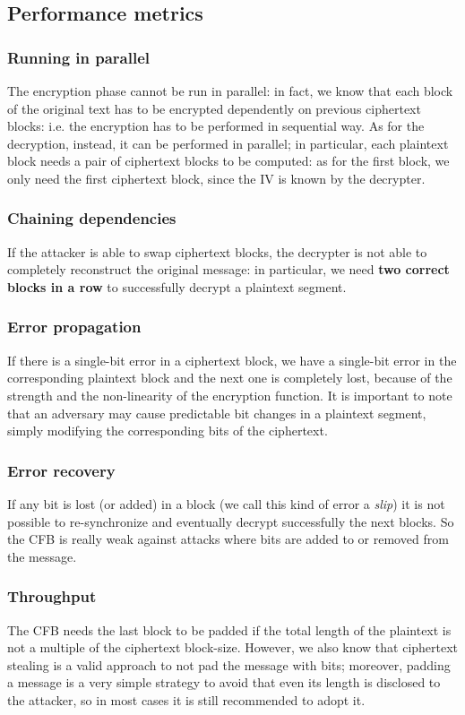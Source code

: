 \documentclass[11 pt]{article}
\begin{document}
\subsection{Performance metrics}
\subsubsection{Running in parallel}
The encryption phase cannot be run in parallel: in fact, we know that each block of the original text has to be encrypted dependently on previous ciphertext blocks: i.e. the encryption has to be performed in sequential way.
As for the decryption, instead, it can be performed in parallel; in particular, each plaintext block needs a pair of ciphertext blocks to be computed: as for the first block, we only need the first ciphertext block, since the IV is known by the decrypter.
\subsubsection{Chaining dependencies}
If the attacker is able to swap ciphertext blocks, the decrypter is not able to completely reconstruct the original message: in particular, we need \textbf{two correct blocks in a row} to successfully decrypt a plaintext segment.
\subsubsection{Error propagation}
If there is a single-bit error in a ciphertext block, we have a single-bit error in the corresponding plaintext block and the next one is completely lost, because of the strength and the non-linearity of the encryption function. It is important to note that an adversary may cause predictable bit changes in a plaintext segment, simply modifying the corresponding bits of the ciphertext.
\subsubsection{Error recovery}
If any  bit is lost (or added) in a block (we call this kind of error a \textit{slip}) it is not possible to re-synchronize and eventually decrypt successfully the next blocks. So the CFB is really weak against attacks where bits are added to or removed from the message.
\subsubsection{Throughput}
The CFB needs the last block to be padded if the total length of the plaintext is not a multiple of the ciphertext block-size. However, we also know that ciphertext stealing is a valid approach to not pad the message with bits; moreover, padding a message is a very simple strategy to avoid that even its length is disclosed to the attacker, so in most cases it is still recommended to adopt it.
\end{document}
